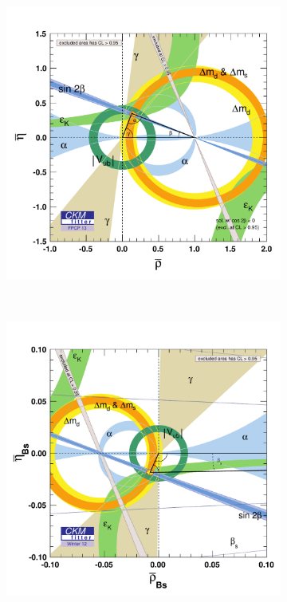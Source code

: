 \begin{figure}[p]
  \centering
  \begin{subfigure}{0.65\textwidth}
    \includegraphics[trim=5mm 2mm 3mm 15mm, clip=true, width=\textwidth]{graphics/intro/rhoeta_large_CMYK}
    \caption{}
  \end{subfigure}\\
  \vspace*{0.03\textwidth}
  \begin{subfigure}{0.65\textwidth}
    \includegraphics[trim=6mm 2mm 2mm 15mm, clip=true, width=\textwidth]{graphics/intro/rhoBsetaBs_large_global_CMYK}

\end{subfigure}
\end{figure}
